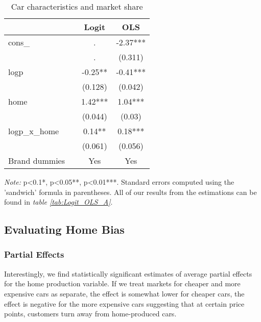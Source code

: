 \documentclass[11pt]{article}
\begin{document}
\begin{table}[H]
    \centering
    \caption{Car characteristics and market share}
    \label{tab:Logit_OLS}
    \begin{threeparttable}
        \begin{tabular}{llcc}
        \toprule
           & {} &     Logit &       OLS \\
        \midrule
        cons\_ & {} &         . &  -2.37*** \\
           & {} &         . &   (0.311) \\
        logp & {} &   -0.25** &  -0.41*** \\
           & {} &   (0.128) &   (0.042) \\
        home & {} &   1.42*** &   1.04*** \\
           & {} &   (0.044) &    (0.03) \\
        logp\_x\_home & {} &    0.14** &   0.18*** \\
           & {} &   (0.061) &   (0.056) \\
        
        \midrule
        Brand dummies & & Yes & Yes \\
        \bottomrule
        \end{tabular}
                \begin{tablenotes}
                    \footnotesize \textit{Note:} p<0.1*, p<0.05**, p<0.01***. Standard errors computed using the 'sandwich' formula in parentheses. All of our results from the estimations can be found in \textit{table \ref{tab:Logit_OLS_A}}.
                \end{tablenotes}
                
    \end{threeparttable}
\end{table}

\subsection{Evaluating Home Bias}
\subsubsection{Partial Effects}
Interestingly, we find statistically significant estimates of average partial effects for the home production variable. If we treat markets for cheaper and more expensive cars as separate, the effect is somewhat lower for cheaper cars, the effect is negative for the more expensive cars suggesting that at certain price points, customers turn away from home-produced cars. 
\end{document}
